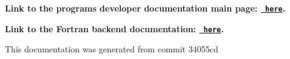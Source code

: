 \label{index_md_repo_PYTHON_MAINPAGE}%
%
 {\bfseries{Link to the program\textquotesingle{}s developer documentation main page\+: \href{https://joegilkes.github.io/PX915-Docs/}{\texttt{ here}}.}}

{\bfseries{Link to the Fortran backend documentation\+: \href{https://joegilkes.github.io/PX915-Docs/fortran/docs/index.html}{\texttt{ here}}.}}

This documentation was generated from commit 34055cd 